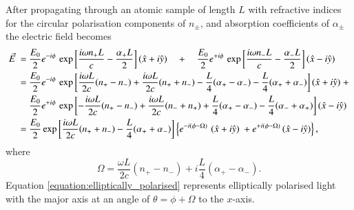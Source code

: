 After propagating through an atomic sample of length $L$ with refractive indices for the circular polarisation components of $n_\pm$, and absorption coefficients of $\alpha_\pm$ the electric field becomes
\begin{align}
\vec{E}\  = \ &\frac{E_0}{2}e^{-i\phi}\,\exp\left[\frac{i\omega n_+ L}{c} - \frac{\alpha_+ L}{2}\right](\hat{x}+i\hat{y})\quad +\quad \frac{E_0}{2}e^{+i\phi}\,\exp\left[\frac{i\omega n_- L}{c} - \frac{\alpha_- L}{2}\right](\hat{x}-i\hat{y}) \notag\\ 
\  = \ &\frac{E_0}{2} e^{-i\phi}\,\exp\left[\frac{i\omega L}{2c}(n_+-n_-) + \frac{i\omega L}{2c}(n_+ + n_-) - \frac{L}{4}(\alpha_+ -\alpha_-) - \frac{L}{4}(\alpha_+ + \alpha_-)\right](\hat{x}+i\hat{y})\ +\notag\\
&\frac{E_0}{2} e^{+i\phi}\,\exp\left[-\frac{i\omega L}{2c}(n_+-n_-) + \frac{i\omega L}{2c}(n_-+n_+) + \frac{L}{4}(\alpha_+-\alpha_-) - \frac{L}{4}(\alpha_-+\alpha_+) \right](\hat{x}-i\hat{y}) \notag\\
\  = \ &\frac{E_0}{2} \exp\left[\frac{i\omega L}{2c}(n_+ + n_-) - \frac{L}{4}(\alpha_+ + \alpha_-)\right] \left\{ e^{-i(\phi - \Omega)}\, \, (\hat{x}+i\hat{y})\ + e^{+i(\phi-\Omega)}\,(\hat{x}-i\hat{y})\right\},\label{equation:elliptically_polarised}
\end{align}
where
\begin{equation}
\Omega = \frac{\omega L}{2c}(n_+-n_-) + i\frac{L}{4}(\alpha_+ -\alpha_-).
\end{equation}
Equation \ref{equation:elliptically_polarised} represents elliptically polarised light with the major axis at an angle of $\theta = \phi + \Omega$ to the $x$-axis.

